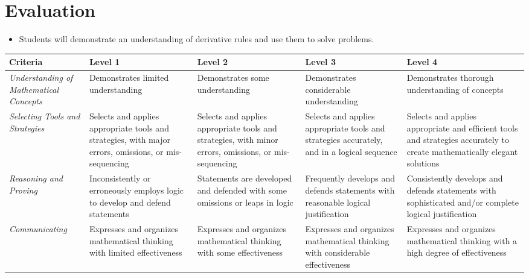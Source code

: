 \documentclass[12pt]{book}
\begin{document}
\section*{Evaluation}

\begin{itemize}
\item Students will demonstrate an understanding of derivative rules and use them to solve problems.
\end{itemize}

\begin{tabular}{| C{2in} | C{1in} | C{1in} | C{1in} | C{1in} |}
\hline
\textbf{Criteria} & \textbf{Level 1} & \textbf{Level 2} & \textbf{Level 3} & \textbf{Level 4} \\
\hline
\emph{Understanding of Mathematical Concepts} & Demonstrates limited understanding & Demonstrates some understanding & Demonstrates considerable understanding & Demonstrates thorough understanding of concepts \\
\hline
\emph{Selecting Tools and Strategies} & Selects and applies appropriate tools and strategies, with major errors, omissions, or mis-sequencing & Selects and applies appropriate tools and strategies, with minor errors, omissions, or mis-sequencing & Selects and applies appropriate tools and strategies accurately, and in a logical sequence & Selects and applies appropriate and efficient tools and strategies accurately to create mathematically elegant solutions \\
\hline
\emph{Reasoning and Proving} & Inconsistently or erroneously employs logic to develop and defend statements & Statements are developed and defended with some omissions or leaps in logic & Frequently develops and defends statements with reasonable logical justification & Consistently develops and defends statements with sophisticated and/or complete logical justification \\
\hline
\emph{Communicating} & Expresses and organizes mathematical thinking with limited effectiveness & Expresses and organizes mathematical thinking with some effectiveness & Expresses and organizes mathematical thinking with considerable effectiveness & Expresses and organizes mathematical thinking with a high degree of effectiveness \\
\hline
\end{tabular}

\pagebreak



\end{document}

